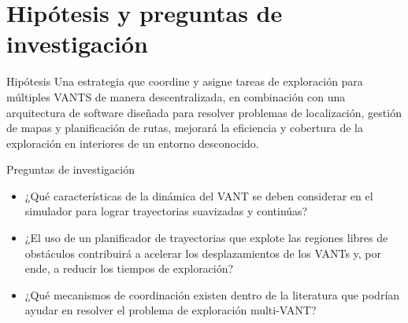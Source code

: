 \documentclass[
  24pt, %
  aspectratio=169, %
]{beamer}
\begin{document}
\section{Hipótesis y preguntas de investigación}
\begin{frame}%

  \begin{block}{Hipótesis}
    Una estrategia que coordine y asigne tareas de exploración para múltiples VANTS de manera descentralizada, en combinación con una arquitectura de software diseñada para resolver problemas de localización, gestión de mapas y planificación de rutas, mejorará la eficiencia y cobertura de la exploración en interiores de un entorno desconocido.
  \end{block}

  \begin{block}{Preguntas de investigación}
    \begin{itemize}
    \item ¿Qué características de la dinámica del VANT se deben considerar en el simulador para lograr trayectorias suavizadas y continúas?
    \item ¿El uso de un planificador de trayectorias que explote las regiones libres de obstáculos contribuirá a acelerar los desplazamientos de los VANTs y, por ende, a reducir los tiempos de exploración?
    \item ¿Qué mecanismos de coordinación existen dentro de la literatura que podrían ayudar en resolver el problema de exploración multi-VANT?
    \end{itemize}
  \end{block}
\end{frame}
\end{document}
